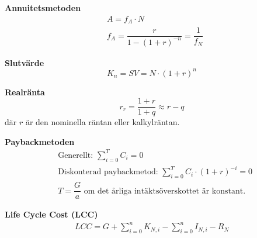 \textbf{Annuitetsmetoden}
\begin{align*}
  & A = f_A \cdot N \\
  & f_A = \dfrac{r}{1-(1+r)^{-n}} = \dfrac{1}{f_N}
\end{align*}

\textbf{Slutvärde}
\begin{equation*}
 K_n= SV =N \cdot (1 + r)^n
\end{equation*}

\textbf{Realränta}
\begin{equation*}
  r_r = \dfrac{1+r}{1+q} \approx r - q 
\end{equation*}
där $r$ är den nominella räntan eller kalkylräntan.

\textbf{Paybackmetoden}
\begin{align*}
  & \text{Generellt: }\sum_{i=0}^{T} C_i = 0 \\
  & \text{Diskonterad paybackmetod: }\sum_{i=0}^{T} C_i \cdot (1+r)^{-i} = 0 \\
  &  T = \dfrac{G}{a} \text{ om det årliga intäktsöverskottet är konstant. } 
\end{align*}

\textbf{Life Cycle Cost (LCC)}
\begin{align*}
  LCC = G + \sum_{i=0}^{n} K_{N,i} - \sum_{i=0}^{n} I_{N,i} - R_N
\end{align*}

